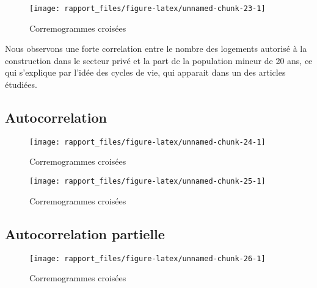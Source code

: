 \documentclass[11pt,]{article}
\begin{document}
\FloatBarrier

\begin{figure}[!htbp]

{\centering \texttt{[image: rapport\_files/figure-latex/unnamed-chunk-23-1]} 

}

\caption{Corremogrammes croisées}\label{fig:unnamed-chunk-23}
\end{figure}

\FloatBarrier

Nous observons une forte correlation entre le nombre des logements
autorisé à la construction dans le secteur privé et la part de la
population mineur de 20 ans, ce qui s'explique par l'idée des cycles de
vie, qui apparait dans un des articles étudiées.

\hypertarget{autocorrelation}{%
\subsection{Autocorrelation}\label{autocorrelation}}

\FloatBarrier

\begin{figure}[!htbp]

{\centering \texttt{[image: rapport\_files/figure-latex/unnamed-chunk-24-1]} 

}

\caption{Corremogrammes croisées}\label{fig:unnamed-chunk-24}
\end{figure}

\FloatBarrier

\FloatBarrier

\begin{figure}[!htbp]

{\centering \texttt{[image: rapport\_files/figure-latex/unnamed-chunk-25-1]} 

}

\caption{Corremogrammes croisées}\label{fig:unnamed-chunk-25}
\end{figure}

\FloatBarrier

\hypertarget{autocorrelation-partielle}{%
\subsection{Autocorrelation partielle}\label{autocorrelation-partielle}}

\FloatBarrier

\begin{figure}[!htbp]

{\centering \texttt{[image: rapport\_files/figure-latex/unnamed-chunk-26-1]} 

}

\caption{Corremogrammes croisées}\label{fig:unnamed-chunk-26}
\end{figure}
\end{document}
